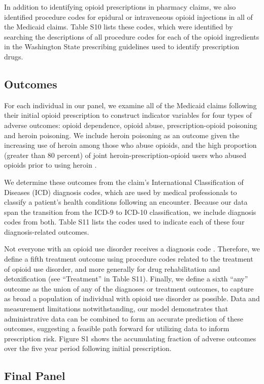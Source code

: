 \documentclass[9pt,twoside]{pnas-new}
\begin{document}
In addition to identifying opioid prescriptions in pharmacy claims, we also identified procedure codes for epidural or intraveneous opioid injections in all of the Medicaid claims. Table S10 lists these codes, which were identified by searching the descriptions of all procedure codes for each of the opioid ingredients in the Washington State prescribing guidelines used to identify prescription drugs.

\subsection{Outcomes}

For each individual in our panel, we examine all of the Medicaid claims following their initial opioid prescription to construct indicator variables for four types of adverse outcomes: opioid dependence, opioid abuse, prescription-opioid poisoning and heroin poisoning. We include heroin poisoning as an outcome given the increasing use of heroin among those who abuse opioids, and the high proportion (greater than 80 percent) of joint heroin-prescription-opioid users who abused opioids prior to using heroin \cite{jones}.

We determine these outcomes from the claim's International Classification of Diseases (ICD) diagnosis codes, which are used by medical professionals to classify a patient's health conditions following an encounter. Because our data span the transition from the ICD-9 to ICD-10 classification, we include diagnosis codes from both. Table S11 lists the codes used to indicate each of these four diagnosis-related outcomes. 

Not everyone with an opioid use disorder receives a diagnosis code \cite{carrell, barocas}. Therefore, we define a fifth treatment outcome using procedure codes related to the treatment of opioid use disorder, and more generally for drug rehabilitation and detoxification (see ``Treatment'' in Table S11). Finally, we define a sixth ``any'' outcome as the union of any of the diagnoses or treatment outcomes, to capture as broad a population of individual with opioid use disorder as possible. Data and measurement limitations notwithstanding, our model demonstrates that administrative data can be combined to form an accurate prediction of these outcomes, suggesting a feasible path forward for utilizing data to inform prescription risk. Figure S1 shows the accumulating fraction of adverse outcomes over the five year period following initial prescription.

\subsection{Final Panel}
\end{document}
